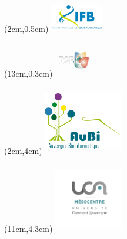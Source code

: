 
\begin{frame}
  \titlepage
  \begin{textblock*}{5cm}(2cm,0.5cm) %
  \includegraphics[width=2.3cm,height=1.3cm]{images/logo_ifb.pdf}
  \end{textblock*}
  \begin{textblock*}{5cm}(13cm,0.3cm) %
  \includegraphics[width=1.5cm,height=1.5cm]{images/i2bc.png}
  \end{textblock*}
  \begin{textblock*}{5cm}(2cm,4cm) %
  \includegraphics[width=3.5cm,height=3cm]{images/logoAuBi-2019.pdf}
  \end{textblock*}
  \begin{textblock*}{5cm}(11cm,4.3cm) %
  \includegraphics[width=3cm,height=3cm]{images/mesocentre.png}
  \end{textblock*}
  
\end{frame}

